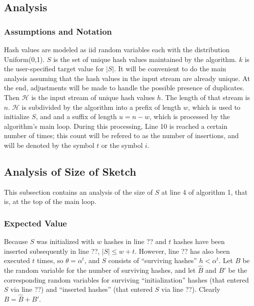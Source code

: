 \documentclass{sig-alternate}
\begin{document}
\subsection{Analysis}

\subsubsection{Assumptions and Notation}

Hash values are modeled as iid random variables each with the
distribution Uniform(0,1). $S$ is the set of unique hash values
maintained by the algorithm.  $k$ is the user-specified target value
for $|S|$.  It will be convenient to do the main analysis assuming
that the hash values in the input stream are already unique. At the end, adjustments
will be made to handle the possible presence of duplicates. Then
$\mathcal{H}$ is the input stream of unique hash values $h$. The length of that
stream is $n$. $\mathcal{H}$ is subdivided by the algorithm into
a prefix of length $w$, which is used to initialize $S$, and 
and a suffix of length $u = n - w$, which is processed by the algorithm's main loop.
During this processing, Line 10 is reached a certain number of
times; this count will be refered to as the number of insertions, and
will be denoted by the symbol $t$ or the symbol $i$.

\subsection{Analysis of Size of Sketch}

This subsection contains an analysis of the size of $S$ at line 4 of algorithm 1, that is, at the top of the main loop.

\subsubsection{Expected Value}


Because $S$ was initialized with $w$ hashes in line ?? and $t$ hashes have been inserted subsequently in 
line ??, $|S| \le w+t$. However, line ?? has also been executed $t$ times, so $\theta = \alpha^t$,
and $S$ consists of ``surviving hashes'' $h < \alpha^t$. Let $B$ be the random variable for
the number of surviving hashes, and let $\hat{B}$ and $B'$ be the corresponding random variables
for surviving ``initialization'' hashes (that entered $S$ via line ??) and ``inserted hashes'' (that entered
$S$ via line ??). Clearly $B = \hat{B} + B'$.
\end{document}
